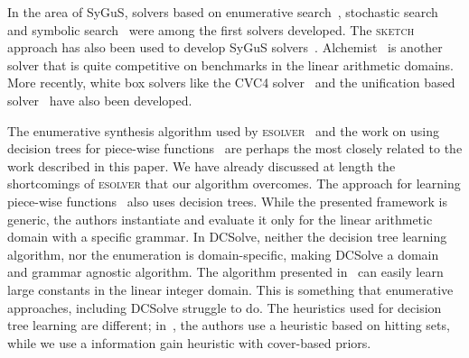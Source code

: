 \documentclass{llncs}
\newcommand{\sygus}{{\sffamily\fontsize{8.5}{10}\selectfont
    SyGuS}\xspace}
\newcommand{\dcsolve}{{\sffamily\fontsize{8.5}{10}\selectfont
    DCSolve}\xspace}
\newcommand{\esolver}{\textsc{esolver}\xspace}
\newcommand{\sketch}{\textsc{sketch}\xspace}
\newcommand{\pwsolve}{{\sffamily\fontsize{8.5}{10}\selectfont
    PWSolve}\xspace}
\begin{document}
In the area of \sygus, solvers based on enumerative
search~\cite{udupa-transit}, stochastic
search~\cite{schkufza-13,udupa-sygus} and symbolic
search~\cite{gulwani-pldi-11,jha-10} were among the first solvers
developed. The \sketch approach has also been used to develop \sygus
solvers~\cite{jeon-15}. Alchemist~\cite{saha-15} is another solver
that is quite competitive on benchmarks in the linear arithmetic
domains. More recently, white box solvers like the CVC4
solver~\cite{reynolds-15} and the unification based
solver~\cite{alur-15} have also been developed.

The enumerative synthesis algorithm used by
\esolver~\cite{udupa-transit, udupa-sygus} and the work on using decision
trees for piece-wise functions~\cite{madhusudan-16-pw} are perhaps the
most closely related to the work described in this paper.
We have already discussed at length the shortcomings of \esolver that our
algorithm overcomes.
The approach for learning piece-wise functions~\cite{madhusudan-16-pw}
also uses decision trees.
  While the presented framework is generic, the authors instantiate and
  evaluate it only for the linear arithmetic domain with a specific
  grammar.
  In \dcsolve, neither the decision tree learning algorithm, nor the
  enumeration is domain-specific, making \dcsolve a domain and grammar
  agnostic algorithm.
  The algorithm presented in~\cite{madhusudan-16-pw} can
  easily learn large constants in the linear integer domain.
  This is something that enumerative approaches, including \dcsolve
  struggle to do.
 The heuristics used for decision tree learning are different;
  in~\cite{madhusudan-16-pw}, the authors use a heuristic based on
  hitting sets, while we use a information gain heuristic with
  cover-based priors.
\end{document}
